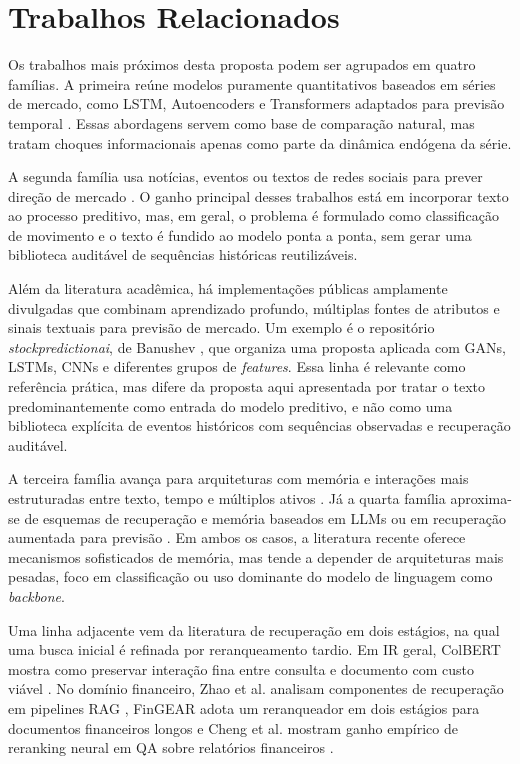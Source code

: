 \documentclass[conference]{IEEEtran}
\begin{document}
\section{Trabalhos Relacionados}

Os trabalhos mais próximos desta proposta podem ser agrupados em quatro famílias. A primeira reúne modelos puramente quantitativos baseados em séries de mercado, como LSTM, Autoencoders e Transformers adaptados para previsão temporal \cite{Fischer:2018, Bao:2017, Lim:2021}. Essas abordagens servem como base de comparação natural, mas tratam choques informacionais apenas como parte da dinâmica endógena da série.

A segunda família usa notícias, eventos ou textos de redes sociais para prever direção de mercado \cite{Ding:2014, Ding:2015, Xu:2018, Sawhney:2020}. O ganho principal desses trabalhos está em incorporar texto ao processo preditivo, mas, em geral, o problema é formulado como classificação de movimento e o texto é fundido ao modelo ponta a ponta, sem gerar uma biblioteca auditável de sequências históricas reutilizáveis.

Além da literatura acadêmica, há implementações públicas amplamente divulgadas que combinam aprendizado profundo, múltiplas fontes de atributos e sinais textuais para previsão de mercado. Um exemplo é o repositório \textit{stockpredictionai}, de Banushev \cite{Banushev:2019}, que organiza uma proposta aplicada com GANs, LSTMs, CNNs e diferentes grupos de \textit{features}. Essa linha é relevante como referência prática, mas difere da proposta aqui apresentada por tratar o texto predominantemente como entrada do modelo preditivo, e não como uma biblioteca explícita de eventos históricos com sequências observadas e recuperação auditável.

A terceira família avança para arquiteturas com memória e interações mais estruturadas entre texto, tempo e múltiplos ativos \cite{Luo:2023}. Já a quarta família aproxima-se de esquemas de recuperação e memória baseados em LLMs ou em recuperação aumentada para previsão \cite{Li:2025RAF, Xiao:2025FinSrag, Wang:2025StockMem}. Em ambos os casos, a literatura recente oferece mecanismos sofisticados de memória, mas tende a depender de arquiteturas mais pesadas, foco em classificação ou uso dominante do modelo de linguagem como \textit{backbone}.

Uma linha adjacente vem da literatura de recuperação em dois estágios, na qual uma busca inicial é refinada por reranqueamento tardio. Em IR geral, ColBERT mostra como preservar interação fina entre consulta e documento com custo viável \cite{Khattab:2020}. No domínio financeiro, Zhao et al. analisam componentes de recuperação em pipelines RAG \cite{Zhao:2024}, FinGEAR adota um reranqueador em dois estágios para documentos financeiros longos \cite{Li:2025FinGEAR} e Cheng et al. mostram ganho empírico de reranking neural em QA sobre relatórios financeiros \cite{Cheng:2026FinRerank}.
\end{document}
